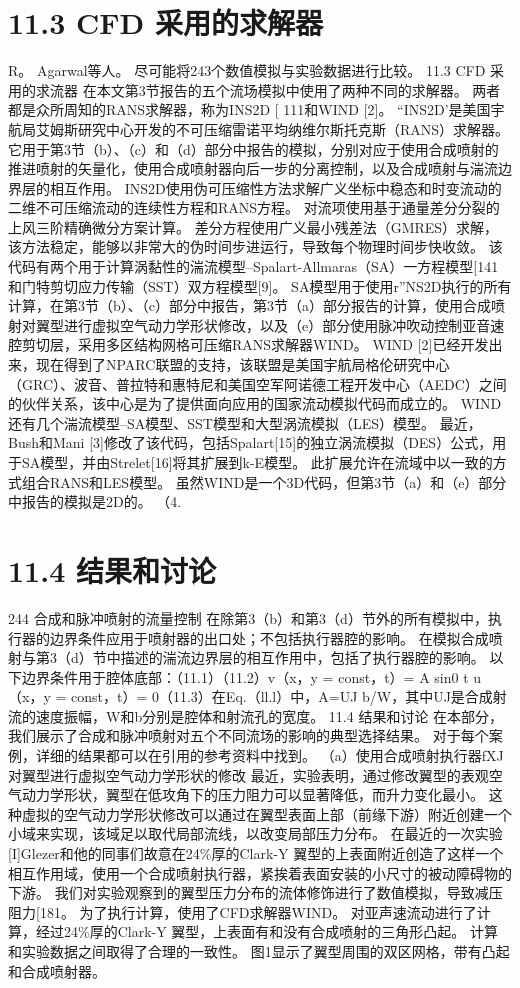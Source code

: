 \documentclass[UTF8,11pt,a4paper,openany,fontset=fandol]{ctexbook}
\begin{document}
\section{11.3 CFD 采用的求解器}
R。 Agarwal等人。 尽可能将243个数值模拟与实验数据进行比较。 11.3 CFD 采用的求流器 在本文第3节报告的五个流场模拟中使用了两种不同的求解器。 两者都是众所周知的RANS求解器，称为INS2D [ 111和WIND [2]。 “INS2D'是美国宇航局艾姆斯研究中心开发的不可压缩雷诺平均纳维尔斯托克斯（RANS）求解器。 它用于第3节（b）、（c）和（d）部分中报告的模拟，分别对应于使用合成喷射的推进喷射的矢量化，使用合成喷射器向后一步的分离控制，以及合成喷射与湍流边界层的相互作用。 INS2D使用伪可压缩性方法求解广义坐标中稳态和时变流动的二维不可压缩流动的连续性方程和RANS方程。 对流项使用基于通量差分分裂的上风三阶精确微分方案计算。 差分方程使用广义最小残差法（GMRES）求解，该方法稳定，能够以非常大的伪时间步进运行，导致每个物理时间步快收敛。 该代码有两个用于计算涡黏性的湍流模型--Spalart-Allmaras（SA）一方程模型[141和门特剪切应力传输（SST）双方程模型[9]。 SA模型用于使用r”NS2D执行的所有计算，在第3节（b）、（c）部分中报告，第3节（a）部分报告的计算，使用合成喷射对翼型进行虚拟空气动力学形状修改，以及（e）部分使用脉冲吹动控制亚音速腔剪切层，采用多区结构网格可压缩RANS求解器WIND。 WIND [2]已经开发出来，现在得到了NPARC联盟的支持，该联盟是美国宇航局格伦研究中心（GRC）、波音、普拉特和惠特尼和美国空军阿诺德工程开发中心（AEDC）之间的伙伴关系，该中心是为了提供面向应用的国家流动模拟代码而成立的。 WIND还有几个湍流模型--SA模型、SST模型和大型涡流模拟（LES）模型。 最近，Bush和Mani [3]修改了该代码，包括Spalart[15]的独立涡流模拟（DES）公式，用于SA模型，并由Strelet[16]将其扩展到k-E模型。 此扩展允许在流域中以一致的方式组合RANS和LES模型。 虽然WIND是一个3D代码，但第3节（a）和（e）部分中报告的模拟是2D的。 （4.

\section{11.4 结果和讨论}
244 合成和脉冲喷射的流量控制 在除第3（b）和第3（d）节外的所有模拟中，执行器的边界条件应用于喷射器的出口处；不包括执行器腔的影响。 在模拟合成喷射与第3（d）节中描述的湍流边界层的相互作用中，包括了执行器腔的影响。 以下边界条件用于腔体底部：（11.1）（11.2）v（x，y = const，t）= A sin0 t u（x，y = const，t）= 0（11.3）在Eq.（ll.l）中，A=UJ b/W，其中UJ是合成射流的速度振幅，W和b分别是腔体和射流孔的宽度。 11.4 结果和讨论 在本部分，我们展示了合成和脉冲喷射对五个不同流场的影响的典型选择结果。 对于每个案例，详细的结果都可以在引用的参考资料中找到。 （a）使用合成喷射执行器fXJ对翼型进行虚拟空气动力学形状的修改 最近，实验表明，通过修改翼型的表观空气动力学形状，翼型在低攻角下的压力阻力可以显著降低，而升力变化最小。 这种虚拟的空气动力学形状修改可以通过在翼型表面上部（前缘下游）附近创建一个小域来实现，该域足以取代局部流线，以改变局部压力分布。 在最近的一次实验[I]Glezer和他的同事们故意在24\%厚的Clark-Y 翼型的上表面附近创造了这样一个相互作用域，使用一个合成喷射执行器，紧挨着表面安装的小尺寸的被动障碍物的下游。 我们对实验观察到的翼型压力分布的流体修饰进行了数值模拟，导致减压阻力[181。 为了执行计算，使用了CFD求解器WIND。 对亚声速流动进行了计算，经过24\%厚的Clark-Y 翼型，上表面有和没有合成喷射的三角形凸起。 计算和实验数据之间取得了合理的一致性。 图1显示了翼型周围的双区网格，带有凸起和合成喷射器。
\end{document}
